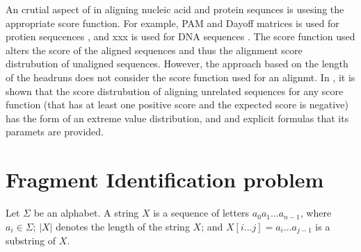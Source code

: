 An crutial aspect of in aligning nucleic acid and protein sequnces is
usesing the appropriate score function. For example, PAM and Dayoff
matrices is used for protien sequcences \cite{}, and xxx is used for DNA
sequences \cite{}.  The score function used alters the score of the
aligned sequences and thus the alignment score distrubution of unaligned
sequences.
However, the approach based on the length of the headruns does not
consider the score function used for an alignmt. 
%
In \cite{}, it is shown that the score distrubution of aligning
unrelated sequences for any score function (that has at least one
positive score and the expected score is negative) has the form of an
extreme value distribution, and and explicit formulas that its paramets
are provided.














\section{Fragment Identification problem}
Let $\Sigma$ be an alphabet. A string $X$ is a sequence of letters $a_0
a_1 \dots a_{n-1}$, where $a_i \in \Sigma$; $|X|$ denotes the length of
the string $X$; and $X[i \dots j] = a_i \dots a_{j-1}$ is a substring of
$X$.

